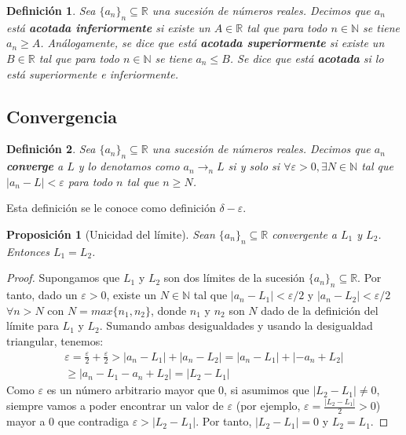 \documentclass{article}
\newtheorem{prop}{Proposición}
\newtheorem{define}{Definición}
\begin{document}
\begin{define}
	Sea $\{ a_n\}_n \subseteq \mathbb{R}$ una sucesión de números reales. Decimos que $a_n$ está \textbf{acotada inferiormente} si existe un $A \in \mathbb{R}$ tal que para todo $n \in \mathbb{N}$ se tiene $a_n \geq A$. Análogamente, se dice que está \textbf{acotada superiormente} si existe un $B \in \mathbb{R}$ tal que para todo $n \in \mathbb{N}$ se tiene $a_n \leq B$. Se dice que está \textbf{acotada} si lo está superiormente e inferiormente.
\end{define}

\subsection{Convergencia}

\begin{define}
	Sea $\{ a_n\}_n \subseteq \mathbb{R}$ una sucesión de números reales. Decimos que $a_n$ \textbf{converge} a $L$ y lo denotamos como $a_n \rightarrow_{n} L$ si y solo si 
	$\forall \varepsilon > 0,\exists N \in \mathbb{N}$ tal que $|a_n - L| < \varepsilon$ para todo $n$ tal que $n \geq N$.
\end{define}
Esta definición se le conoce como definición $\delta-\varepsilon$.

\begin{prop}[Unicidad del límite]
	Sean $\{ a_n\}_n \subseteq \mathbb{R}$ convergente a $L_1$ y $L_2$. Entonces $L_1 = L_2$.
\end{prop}
\begin{proof}
	Supongamos que $L_1$ y $L_2$ son dos límites de la sucesión $\{ a_n\}_n \subseteq \mathbb{R}$. Por tanto, dado un $\varepsilon > 0$, existe un $N \in \mathbb{N}$ 
	tal que $|a_n - L_1| < \varepsilon/2$ y $|a_n - L_2| < \varepsilon/2\ $ $\forall n > N$ con $N=max\{n_1, n_2\}$, donde $n_1$ y $n_2$ son $N$ dado de la definición del límite para 
	$L_1$ y $L_2$. Sumando ambas desigualdades y usando la desigualdad triangular, tenemos:
	\begin{align*}
		\varepsilon = \frac{\varepsilon}{2} + \frac{\varepsilon}{2} > |a_n - L_1| + |a_n - L_2| = |a_n - L_1| + |-a_n + L_2| \\ \geq |a_n - L_1 - a_n + L_2| = |L_2 - L_1|
	\end{align*}
	Como $\varepsilon$ es un número arbitrario mayor que 0, si asumimos que $|L_2 - L_1| \neq 0$, siempre vamos a poder encontrar un valor de $\varepsilon$ (por ejemplo, 
	$\varepsilon = \frac{|L_2 - L_1|}{2} > 0$) mayor a 0 que contradiga $\varepsilon > |L_2 - L_1|$. Por tanto, $|L_2 - L_1| = 0$ y $L_2 = L_1$.
\end{proof}
\end{document}
